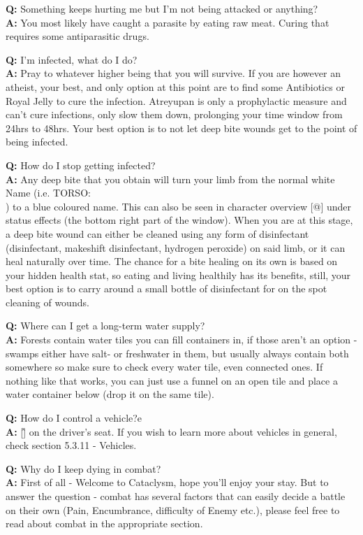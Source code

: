 \textbf{Q:} Something keeps hurting me but I'm not being attacked or anything?\\
\textbf{A:} You most likely have caught a parasite by eating raw meat. Curing that requires some antiparasitic drugs.

\textbf{Q:} I'm infected, what do I do?\\
\textbf{A:} Pray to whatever higher being that you will survive. If you are however an atheist, your best, and only option at this point are to find some Antibiotics or Royal Jelly to cure the infection. Atreyupan is only a prophylactic measure and can't cure infections, only slow them down, prolonging your time window from 24hrs to 48hrs. Your best option is to not let deep bite wounds get to the point of being infected.

\textbf{Q:} How do I stop getting infected?\\
\textbf{A:} Any deep bite that you obtain will turn your limb from the normal white Name (i.e. TORSO: \textbar\textbar\textbar\textbar\\) to a blue coloured name. This can also be seen in character overview [@] under status effects (the bottom right part of the window). When you are at this stage, a deep bite wound can either be cleaned using any form of disinfectant (disinfectant, makeshift disinfectant, hydrogen peroxide) on said limb, or it can heal naturally over time. The chance for a bite healing on its own is based on your hidden health stat, so eating and living healthily has its benefits, still, your best option is to carry around a small bottle of disinfectant for on the spot cleaning of wounds.

\textbf{Q:} Where can I get a long-term water supply?\\
\textbf{A:} Forests contain water tiles you can fill containers in, if those aren't an option - swamps either have salt- or freshwater in them, but usually always contain both somewhere so make sure to check every water tile, even connected ones. If nothing like that works, you can just use a funnel on an open tile and place a water container below (drop it on the same tile).

\textbf{Q:} How do I control a vehicle?e\\
\textbf{A:} [\^] on the driver's seat. If you wish to learn more about vehicles in general, check section 5.3.11 - Vehicles.

\textbf{Q:} Why do I keep dying in combat?\\
\textbf{A:} First of all - Welcome to Cataclysm, hope you'll enjoy your stay. But to answer the question - combat has several factors that can easily decide a battle on their own (Pain, Encumbrance, difficulty of Enemy etc.), please feel free to read about combat in the appropriate section.

